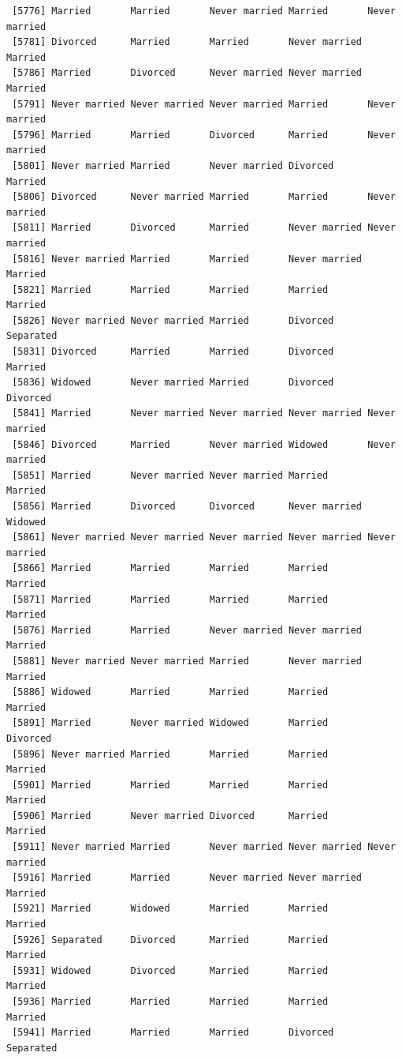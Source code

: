 \documentclass[
  letterpaper,
  DIV=11,
  numbers=noendperiod,
  oneside]{scrartcl}
\begin{document}
\begin{verbatim}
 [5776] Married       Married       Never married Married       Never married
 [5781] Divorced      Married       Married       Never married Married      
 [5786] Married       Divorced      Never married Never married Married      
 [5791] Never married Never married Never married Married       Never married
 [5796] Married       Married       Divorced      Married       Never married
 [5801] Never married Married       Never married Divorced      Married      
 [5806] Divorced      Never married Married       Married       Never married
 [5811] Married       Divorced      Married       Never married Never married
 [5816] Never married Married       Married       Never married Married      
 [5821] Married       Married       Married       Married       Married      
 [5826] Never married Never married Married       Divorced      Separated    
 [5831] Divorced      Married       Married       Divorced      Married      
 [5836] Widowed       Never married Married       Divorced      Divorced     
 [5841] Married       Never married Never married Never married Never married
 [5846] Divorced      Married       Never married Widowed       Never married
 [5851] Married       Never married Never married Married       Married      
 [5856] Married       Divorced      Divorced      Never married Widowed      
 [5861] Never married Never married Never married Never married Never married
 [5866] Married       Married       Married       Married       Married      
 [5871] Married       Married       Married       Married       Married      
 [5876] Married       Married       Never married Never married Married      
 [5881] Never married Never married Married       Never married Married      
 [5886] Widowed       Married       Married       Married       Married      
 [5891] Married       Never married Widowed       Married       Divorced     
 [5896] Never married Married       Married       Married       Married      
 [5901] Married       Married       Married       Married       Married      
 [5906] Married       Never married Divorced      Married       Married      
 [5911] Never married Married       Never married Never married Never married
 [5916] Married       Married       Never married Never married Married      
 [5921] Married       Widowed       Married       Married       Married      
 [5926] Separated     Divorced      Married       Married       Married      
 [5931] Widowed       Divorced      Married       Married       Married      
 [5936] Married       Married       Married       Married       Married      
 [5941] Married       Married       Married       Divorced      Separated    

\end{verbatim}
\end{document}

